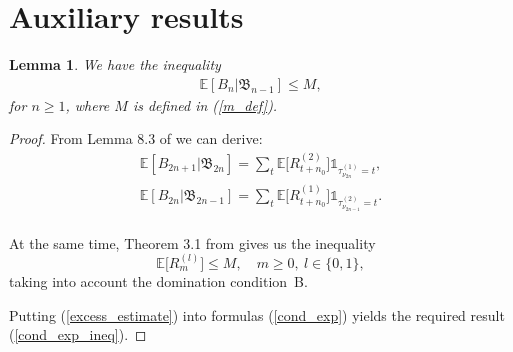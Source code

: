 \documentclass[numbers,compress,v1.0.1]{vmsta}
\newcommand{\lsum}{\sum\limits}
\newtheorem{lemma}{Lemma}
\theoremstyle{definition}
\begin{document}
\section{Auxiliary results}
%
\begin{lemma}\label{lemma1}
We have the inequality
%
\begin{equation}
\label{cond_exp_ineq} %
\begin{array}{c}
\mathbb{E}[B_{n} | \mathfrak{B}_{n-1}] \le M,
\end{array} %
\end{equation}
%
for $n \ge1$, where $M$ is defined in (\ref{m_def}).
\end{lemma}

\begin{proof}
From Lemma 8.3 of \cite{Coupling} we can derive:
%
\begin{equation}
\label{cond_exp} %
\begin{array}{c}
\mathbb{E}[ B_{2n+1} | \mathfrak{B}_{2n}] = \displaystyle \lsum_{t} \mathbb{E}\bigl[R^{(2)}_{t+n_0}\bigr] \mathbb{1}_{\tau^{(1)}_{\nu_{2n}} = t}, \\[15pt]
\mathbb{E}[ B_{2n} | \mathfrak{B}_{2n-1}] = \displaystyle \lsum_{t} \mathbb{E}\bigl[R^{(1)}_{t+n_0}\bigr] \mathbb{1}_{\tau^{(2)}_{\nu_{2n-1}} = t}. \\
\end{array} %
\end{equation}

At the same time, Theorem 3.1 from \cite{Excess} gives us the inequality
%
\begin{equation}
\label{excess_estimate} \mathbb{E}\bigl[R^{(l)}_{m}\bigr] \le M,\quad m \ge0,\ l\in\{0,1\},
\end{equation}
%
taking into account the domination condition~B.

Putting (\ref{excess_estimate}) into formulas (\ref{cond_exp}) yields
the required result (\ref{cond_exp_ineq}).
\end{proof}
\end{document}
